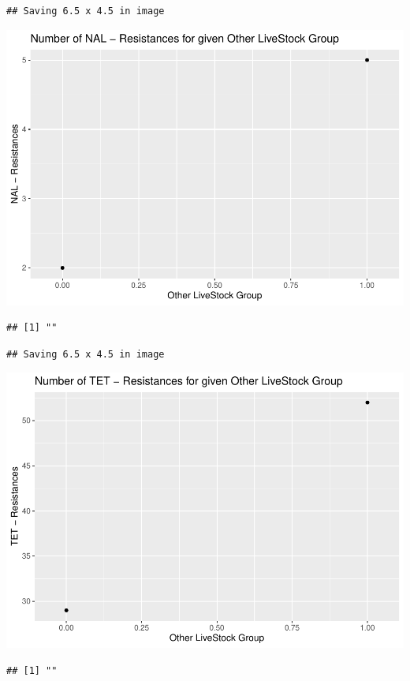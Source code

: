 \documentclass[
]{article}
\begin{document}
\begin{verbatim}
## Saving 6.5 x 4.5 in image
\end{verbatim}

\includegraphics{NResistenzen_files/figure-latex/binary_or_nominal_variables-17.pdf}

\begin{verbatim}
## [1] ""
\end{verbatim}

\begin{verbatim}
## Saving 6.5 x 4.5 in image
\end{verbatim}

\includegraphics{NResistenzen_files/figure-latex/binary_or_nominal_variables-18.pdf}

\begin{verbatim}
## [1] ""
\end{verbatim}
\end{document}
